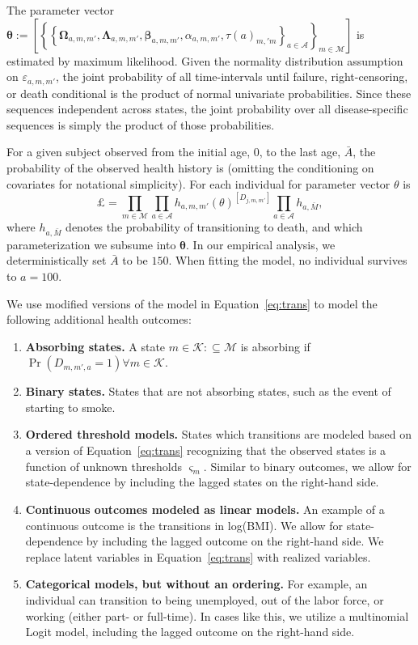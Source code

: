 \noindent The parameter vector $\bm{\theta} := \left[ \left\{ \left\{  \bm{\Omega}_{a,m,m'}, \bm{\Lambda}_{a,m,m'}, \bm{\beta}_{a,m,m'}, \alpha_{a,m,m'}, \tau \left( a \right) _{m,'m}  \right\}_{a \in \mathcal{A}} \right\}_{m \in \mathcal{M}} \right]$ is estimated by maximum likelihood. Given the normality distribution assumption on $\varepsilon_{a,m,m'}$, the joint probability of all time-intervals until failure, right-censoring, or death conditional is the product of normal univariate probabilities. Since these sequences independent across states, the joint probability over all disease-specific sequences is simply the product of those probabilities.

\noindent For a given subject observed from the initial age, $0$, to the last age, $\bar{A}$, the probability of the observed health history is (omitting the conditioning on covariates for notational simplicity). For each individual for parameter vector $\theta$ is
\begin{equation}
\mathsterling = \prod_{m \in \mathcal{M}} \prod_{a \in \mathcal{A}} {h_{a,m,m'}(\theta)}^{[D_{j,m,m'}]} \prod_{a \in \mathcal{A}}{ h_{a,\bar{M}} }, 
\end{equation}
\noindent where $ h_{a,\bar{M}}$ denotes the probability of transitioning to death, and which parameterization we subsume into $\bm{\theta}$. In our empirical analysis, we deterministically set $\bar{A}$ to be $150$. When fitting the model, no individual survives to $a = 100$.

We use modified versions of the model in Equation~\eqref{eq:trans} to model the following additional health outcomes: 

\begin{enumerate}
\item \textbf{Absorbing states.} A state $m \in \mathcal{K} :\subseteq \mathcal{M}$ is absorbing if $\Pr \left( D_{m,m',a} = 1 \right) \forall m \in \mathcal{K}$.
\item \textbf{Binary states.} States that are not absorbing states, such as the event of starting to smoke.
\item \textbf{Ordered threshold models.} States which transitions are modeled based on a version of Equation~\eqref{eq:trans} recognizing that the observed states is a function of unknown thresholds $\varsigma_m$. Similar to binary outcomes, we allow for state-dependence by including the lagged states on the right-hand side.
\item \textbf{Continuous outcomes modeled as linear models.} An example of a continuous outcome is the
transitions in log(BMI). We allow for state-dependence by including the lagged outcome on the right-hand side. We replace latent variables in Equation~\eqref{eq:trans} with realized variables.
\item \textbf{Categorical models, but without an ordering.} For example, an individual can transition
to being unemployed, out of the labor force, or working (either part- or full-time). In cases like this, we utilize
a multinomial Logit model, including the lagged outcome on the right-hand side.
\end{enumerate}

